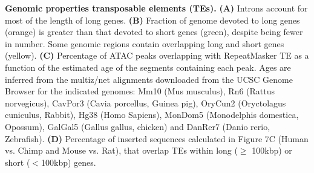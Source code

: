 \textbf{Genomic properties transposable elements (TEs).} 
\textbf{(A)} Introns account for most of the length of long genes. 
\textbf{(B)} Fraction of genome devoted to long genes (orange) is greater than that devoted to short genes (green), despite being fewer in number. Some genomic regions contain overlapping long and short genes (yellow).
\textbf{(C)} Percentage of ATAC peaks  overlapping with RepeatMasker TE as a function of the estimated age of the segments containing each peak. Ages are inferred from the multiz/net alignments downloaded from the UCSC Genome Browser for the indicated genomes: Mm10 (Mus musculus), Rn6 (Rattus norvegicus), CavPor3 (Cavia porcellus, Guinea pig), OryCun2 (Oryctolagus cuniculus, Rabbit), Hg38 (Homo Sapiens), MonDom5 (Monodelphis domestica, Opossum), GalGal5 (Gallus gallus, chicken) and DanRer7 (Danio rerio, Zebrafish). 
\textbf{(D)} Percentage of inserted sequences calculated in Figure 7C (Human vs. Chimp and Mouse vs. Rat), that overlap TEs within long ($\geq$ 100kbp) or short ($<$100kbp) genes. 